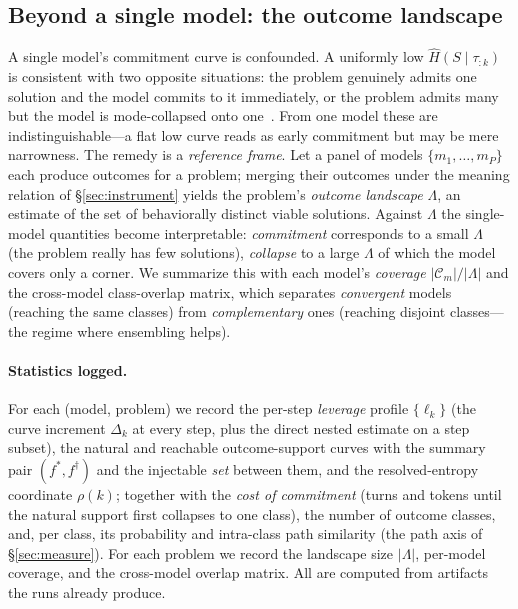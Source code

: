 \documentclass[11pt]{article}
\newcommand{\Hk}{\widehat{H}\!\left(S \mid \tau_{:k}\right)}
\begin{document}
\subsection{Beyond a single model: the outcome landscape}
\label{sec:landscape}
A single model's commitment curve is confounded. A uniformly low $\Hk$ is
consistent with two opposite situations: the problem genuinely admits one solution
and the model commits to it immediately, or the problem admits many but the model
is mode-collapsed onto one~\citep{zhang2025noveltybench}. From one model these are
indistinguishable---a flat low curve reads as early commitment but may be mere
narrowness. The remedy is a \emph{reference frame}. Let a panel of models
$\{m_1,\dots,m_P\}$ each produce outcomes for a problem; merging their outcomes
under the meaning relation of \S\ref{sec:instrument} yields the problem's
\emph{outcome landscape} $\Lambda$, an estimate of the set of behaviorally distinct
viable solutions. Against $\Lambda$ the single-model quantities become
interpretable: \emph{commitment} corresponds to a small $\Lambda$ (the problem
really has few solutions), \emph{collapse} to a large $\Lambda$ of which the model
covers only a corner. We summarize this with each model's \emph{coverage}
$\lvert\mathcal{C}_m\rvert/\lvert\Lambda\rvert$ and the cross-model class-overlap
matrix, which separates \emph{convergent} models (reaching the same classes) from
\emph{complementary} ones (reaching disjoint classes---the regime where ensembling
helps).

\paragraph{Statistics logged.}
For each (model, problem) we record the per-step \emph{leverage} profile
$\{\ell_k\}$ (the curve increment $\Delta_k$ at every step, plus the direct nested
estimate on a step subset), the natural and reachable outcome-support curves with
the summary pair $(f^\ast,f^\dagger)$ and the injectable \emph{set} between them, and
the resolved-entropy coordinate $\rho(k)$; together with the \emph{cost of
commitment} (turns and tokens until the natural support first collapses to one
class), the number of outcome classes, and, per class, its probability and
intra-class path similarity (the path axis of \S\ref{sec:measure}). For each problem
we record the landscape size $\lvert\Lambda\rvert$, per-model coverage, and the
cross-model overlap matrix. All are computed from artifacts the runs already
produce.
\end{document}
